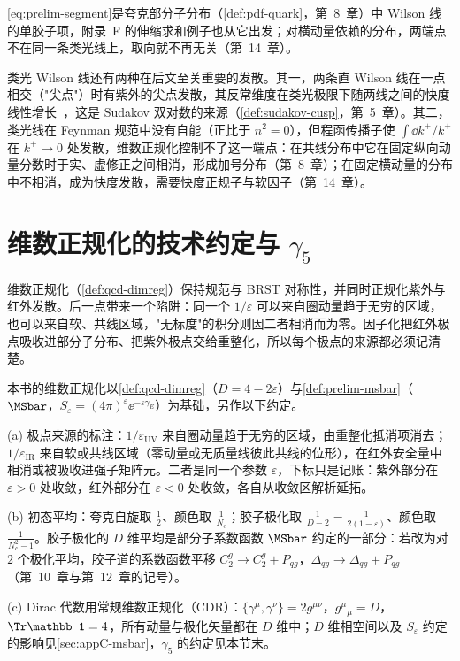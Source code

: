 \cref{eq:prelim-segment}是夸克部分子分布（\cref{def:pdf-quark}，第~8~章）中 Wilson 线的单胶子项，附录~F 的伸缩求和例子也从它出发；对横动量依赖的分布，两端点不在同一条类光线上，取向就不再无关（第~14~章）。

类光 Wilson 线还有两种在后文至关重要的发散。其一，两条直 Wilson 线在一点相交（"尖点"）时有紫外的尖点发散，其反常维度在类光极限下随两线之间的快度线性增长~\cite{Polyakov1980,BrandtNeriSato1981,KorchemskyRadyushkin1987}，这是 Sudakov 双对数的来源（\cref{def:sudakov-cusp}，第~5~章）。其二，类光线在 Feynman 规范中没有自能（正比于 $n^2=0$），但程函传播子使 $\int\dd k^+/k^+$ 在 $k^+\to0$ 处发散，维数正规化控制不了这一端点：在共线分布中它在固定纵向动量分数时于实、虚修正之间相消，形成加号分布（第~8~章）；在固定横动量的分布中不相消，成为快度发散，需要快度正规子与软因子（第~14~章）。
\section{维数正规化的技术约定与 $\gamma_5$}\label{sec:prelim-dimreg}

维数正规化（\cref{def:qcd-dimreg}）保持规范与 BRST 对称性，并同时正规化紫外与红外发散。后一点带来一个陷阱：同一个 $1/\varepsilon$ 可以来自圈动量趋于无穷的区域，也可以来自软、共线区域，"无标度"的积分则因二者相消而为零。因子化把红外极点吸收进部分子分布、把紫外极点交给重整化，所以每个极点的来源都必须记清楚。

\begin{definition}[维数正规化的技术约定]\label{def:prelim-dr-conventions}
本书的维数正规化以\cref{def:qcd-dimreg}（$D=4-2\varepsilon$）与\cref{def:prelim-msbar}（$\MSbar$，$S_\varepsilon=(4\pi)^\varepsilon\ee^{-\varepsilon\gamma_E}$）为基础，另作以下约定。
\par
(a) 极点来源的标注：$1/\varepsilon_{\mathrm{UV}}$ 来自圈动量趋于无穷的区域，由重整化抵消项消去；$1/\varepsilon_{\mathrm{IR}}$ 来自软或共线区域（零动量或无质量线彼此共线的位形），在红外安全量中相消或被吸收进强子矩阵元。二者是同一个参数 $\varepsilon$，下标只是记账：紫外部分在 $\varepsilon>0$ 处收敛，红外部分在 $\varepsilon<0$ 处收敛，各自从收敛区解析延拓。
\par
(b) 初态平均：夸克自旋取 $\frac12$、颜色取 $\frac1{N_c}$；胶子极化取 $\frac1{D-2}=\frac1{2(1-\varepsilon)}$、颜色取 $\frac1{N_c^2-1}$。胶子极化的 $D$ 维平均是部分子系数函数 $\MSbar$ 约定的一部分：若改为对 $2$ 个极化平均，胶子道的系数函数平移 $C_2^g\to C_2^g+P_{qg}$，$\Delta_{qg}\to\Delta_{qg}+P_{qg}$（第~10~章与第~12~章的记号）。%
\par
(c) Dirac 代数用常规维数正规化（CDR）：$\{\gamma^\mu,\gamma^\nu\}=2g^{\mu\nu}$，$g^\mu{}_\mu=D$，$\Tr\mathbb 1=4$，所有动量与极化矢量都在 $D$ 维中；$D$ 维相空间以及 $S_\varepsilon$ 约定的影响见\cref{sec:appC-msbar}，$\gamma_5$ 的约定见本节末。
\end{definition}

